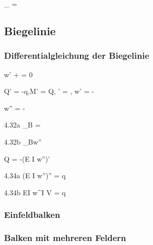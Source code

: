 \documentclass[11pt]{article}
\newcommand{\1}{ {\mathds{1}} }
\newcommand{\abs}[1]{\lvert#1\rvert}
\begin{document}
\begin{multicols*}{3}
		\begin{formel}{4.28}
			\sigma_{}
			=
			\frac{\abs{M}}{W}
		\end{formel}

		\subsection{Biegelinie}
		\subsubsection{Differentialgleichung der Biegelinie}

		\begin{formel}{4.29}
			w' + \psi = 0
		\end{formel}

		\begin{formel}{4.30}
			Q' = -q,\quad M' = Q, \quad \psi' = , \quad w' = -\psi
		\end{formel}

		\begin{formel}{4.31}
			w'' = -
		\end{formel}

		\begin{formel}{4.32a}
			\varkappa_B = 
		\end{formel}

		\begin{formel}{4.32b}
			\varkappa_B\approx w''
		\end{formel}

		\begin{formel}{4.33}
			Q = -(E I w'')'
		\end{formel}

		\begin{formel}{4.34a}
			(E I w'')'' = q
		\end{formel}

		\begin{formel}{4.34b}
			EI w^{I V} = q
		\end{formel}

		\subsubsection{Einfeldbalken}
		\subsubsection{Balken mit mehreren Feldern}


\end{multicols*}
\end{document}
